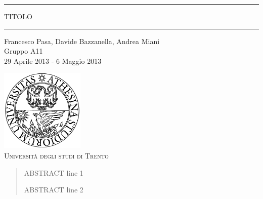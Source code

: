 \begin{titlepage}
\begin{center}

	\hrule \vspace{0.5cm}
     	\textsc{\LARGE TITOLO}
	\vspace{0.5cm} \hrule \vspace{2cm}

      	{\large Francesco Pasa, Davide Bazzanella, Andrea Miani\\
		Gruppo A11}\\
	\vspace{0.5cm}
      	{\large 29 Aprile 2013 - 6 Maggio 2013}
	\vfill

	\includegraphics[width=4cm]{unitn_logo.png}\\
	\vspace{1cm}
        \textsc{\Large Università degli studi di Trento}
	\vfill

	{\begin{abstract}
ABSTRACT line 1

ABSTRACT line 2
	 \end{abstract}}
\end{center}
\end{titlepage}
